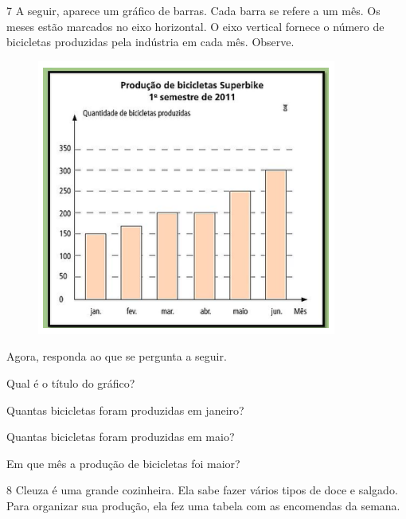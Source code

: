 \num{7} A seguir, aparece um gráfico de barras. Cada barra se refere a um mês. Os
meses estão marcados no eixo horizontal. O eixo vertical fornece o
número de bicicletas produzidas pela indústria em cada mês. Observe.

\begin{figure}[H]
\centering\includegraphics[width=3.875in,height=3.57292in]{./imgSAEB_6_MAT/media/image85.png}
\end{figure}

Agora, responda ao que se pergunta a seguir.

\begin{escolha}
\item Qual é o título do gráfico?\\

\item Quantas bicicletas foram produzidas em janeiro?\\

\item Quantas bicicletas foram produzidas em maio?\\

\item Em que mês a produção de bicicletas foi maior?\\
\end{escolha}

\num{8} Cleuza é uma grande cozinheira. Ela sabe fazer vários tipos de
doce e salgado. Para organizar sua produção, ela fez uma tabela com as
encomendas da semana.

